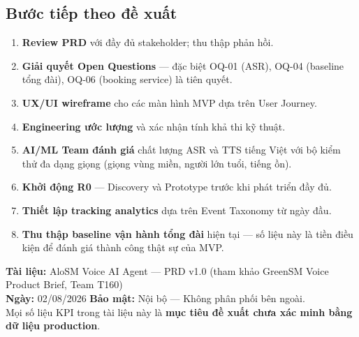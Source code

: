 \documentclass[12pt,a4paper]{article}
\begin{document}
\subsection*{Bước tiếp theo đề xuất}
\begin{enumerate}
  \item \textbf{Review PRD} với đầy đủ stakeholder; thu thập phản hồi.
  \item \textbf{Giải quyết Open Questions} --- đặc biệt OQ-01 (ASR), OQ-04 (baseline tổng đài), OQ-06 (booking service) là tiên quyết.
  \item \textbf{UX/UI wireframe} cho các màn hình MVP dựa trên User Journey.
  \item \textbf{Engineering ước lượng} và xác nhận tính khả thi kỹ thuật.
  \item \textbf{AI/ML Team đánh giá} chất lượng ASR và TTS tiếng Việt với bộ kiểm thử đa dạng giọng (giọng vùng miền, người lớn tuổi, tiếng ồn).
  \item \textbf{Khởi động R0} --- Discovery và Prototype trước khi phát triển đầy đủ.
  \item \textbf{Thiết lập tracking analytics} dựa trên Event Taxonomy từ ngày đầu.
  \item \textbf{Thu thập baseline vận hành tổng đài} hiện tại --- số liệu này là tiền điều kiện để đánh giá thành công thật sự của MVP.
\end{enumerate}

\vspace{1cm}
\begin{tcolorbox}[notebox]
  \textbf{Tài liệu:} AloSM Voice AI Agent --- PRD v1.0 (tham khảo GreenSM Voice Product Brief, Team T160)\\
  \textbf{Ngày:} 02/08/2026 \qquad \textbf{Bảo mật:} Nội bộ --- Không phân phối bên ngoài.\\
  Mọi số liệu KPI trong tài liệu này là \textbf{mục tiêu đề xuất chưa xác minh bằng dữ liệu production}.
\end{tcolorbox}
\end{document}
